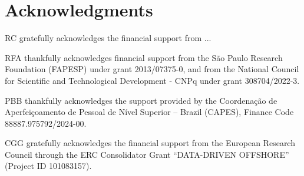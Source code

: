 
\section{Acknowledgments}
RC gratefully acknowledges the financial support from ...

RFA thankfully acknowledges financial support from the São Paulo Research Foundation (FAPESP) under grant 2013/07375-0, and from the National Council for Scientific and Technological Development - CNPq under grant 308704/2022-3.

PBB thankfully acknowledges the support provided by the Coordenação de Aperfeiçoamento de Pessoal de Nível Superior – Brazil (CAPES), Finance Code 88887.975792/2024-00.

CGG gratefully acknowledges the financial support from the European Research Council through the ERC Consolidator Grant ``DATA-DRIVEN OFFSHORE'' (Project ID 101083157).